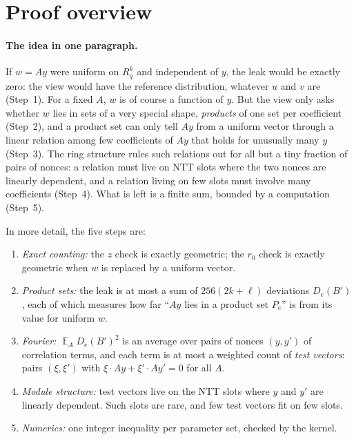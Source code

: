 \documentclass[11pt]{article}
\theoremstyle{definition}
\theoremstyle{remark}
\newcommand{\Rq}{R_q}
\newcommand{\E}{\mathop{\mathbb{E}}}
\begin{document}
\section{Proof overview}\label{sec:proof}

\paragraph{The idea in one paragraph.}
If $w = Ay$ were uniform on $\Rq^k$ and independent of $y$, the leak would be exactly zero: the
view would have the reference distribution, whatever $u$ and $v$ are (Step~1). For a fixed $A$,
$w$ is of course a function of $y$. But the view only asks whether $w$ lies in sets of a very
special shape, \emph{products} of one set per coefficient (Step~2), and a product set can only
tell $Ay$ from a uniform vector through a linear relation among few coefficients of $Ay$ that
holds for unusually many $y$ (Step~3). The ring structure rules such relations out for all but a
tiny fraction of pairs of nonces: a relation must live on NTT slots where the two nonces are
linearly dependent, and a relation living on few slots must involve many coefficients (Step~4).
What is left is a finite sum, bounded by a computation (Step~5).

\medskip\noindent In more detail, the five steps are:
\begin{enumerate}
  \item \emph{Exact counting:} the $z$ check is exactly geometric; the $r_0$ check is exactly
        geometric when $w$ is replaced by a uniform vector.
  \item \emph{Product sets:} the leak is at most a sum of $256(2k+\ell)$ deviations $D_e(B')$,
        each of which measures how far ``$Ay$ lies in a product set $P_e$'' is from its value
        for uniform $w$.
  \item \emph{Fourier:} $\E_A D_e(B')^2$ is an average over pairs of nonces $(y,y')$ of
        correlation terms, and each term is at most a weighted count of \emph{test vectors}:
        pairs $(\xi,\xi')$ with $\xi\cdot Ay+\xi'\cdot Ay' = 0$ for all $A$.
  \item \emph{Module structure:} test vectors live on the NTT slots where $y$ and $y'$ are
        linearly dependent. Such slots are rare, and few test vectors fit on few slots.
  \item \emph{Numerics:} one integer inequality per parameter set, checked by the kernel.
\end{enumerate}
\end{document}
